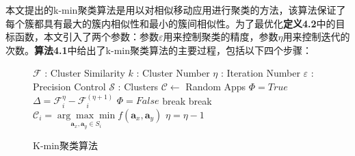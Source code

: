 本文提出的k-min聚类算法是用以对相似移动应用进行聚类的方法，该算法保证了每个簇都具有最大的簇内相似性和最小的簇间相似性。为了最优化\textbf{定义4.2}中的目标函数，本文引入了两个参数：参数$\varepsilon$用来控制聚类的精度，参数$\eta$用来控制迭代的次数。\textbf{算法4.1}中给出了k-min聚类算法的主要过程，包括以下四个步骤：

\begin{figure}[htb]
\centering
\begin{minipage}{.7\linewidth}
\begin{algorithm}[H]
	\small
	\caption{K-min聚类算法}
	\begin{algorithmic}[1]
	\Require
		\Statex $\mathcal{F}$ : Cluster Similarity
		\Statex $k$ : Cluster Number
		\Statex $\eta$ : Iteration Number
		\Statex $\varepsilon$ : Precision Control
	\Ensure
		\Statex $\mathcal{S}$ : Clusters
	\Statex
	\State $\mathcal{C} \leftarrow$ Random Apps
		\State $\Phi = True$
			\State $\Delta = \mathcal{F}_i^{\eta} - \mathcal{F}_i^{(\eta+1)}$
				\State $\Phi = False$
				\State break
			\EndIf
		\EndFor
		\If {$\Phi$}
			\State break
		\Else
				\State $\mathcal{C}_i = \underset{\mathbf{a}_x, \mathbf{a}_y \in S_i}{\arg \max \min} f(\mathbf{a}_x, \mathbf{a}_y)$
			\EndFor
		\EndIf
		\State $\eta = \eta - 1$\
	\EndWhile
	\end{algorithmic}
\end{algorithm}
\end{minipage}
\end{figure}

